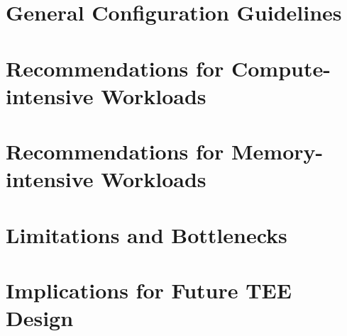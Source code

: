 \section{General Configuration Guidelines}

\section{Recommendations for Compute-intensive Workloads}

\section{Recommendations for Memory-intensive Workloads}

\section{Limitations and Bottlenecks}

\section{Implications for Future TEE Design}